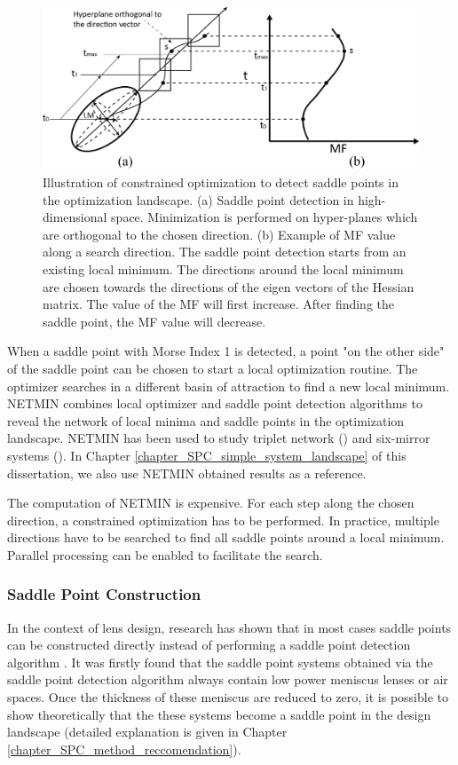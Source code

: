 \begin{figure}[h]
    \centering
    \includegraphics[scale=0.58]{chapter-1/figures/spd_plot.png}
    \caption{Illustration of constrained optimization to detect saddle points in the optimization landscape. (a) Saddle point detection in high-dimensional space. Minimization is performed on hyper-planes which are orthogonal to the chosen direction. (b) Example of MF value along a search direction. The saddle point detection starts from an existing local minimum. The directions around the local minimum are chosen towards the directions of the eigen vectors of the Hessian matrix. The value of the MF will first increase. After finding the saddle point, the MF value will decrease. }
    \label{fig: spd_illustration}
\end{figure} 

When a saddle point with Morse Index 1 is detected, a point "on the other side" of the saddle point can be chosen to start a local optimization routine. The optimizer searches in a different basin of attraction to find a new local minimum. NETMIN combines local optimizer and saddle point detection algorithms to reveal the network of local minima and saddle points in the optimization landscape. NETMIN has been used to study triplet network (\cite{PascalTriplet2009}) and six-mirror systems (\cite{MarinescuSPD07}). In Chapter \ref{chapter_SPC_simple_system_landscape} of this dissertation, we also use NETMIN obtained results as a reference. 

The computation of NETMIN is expensive. For each step along the chosen direction, a constrained optimization has to be performed. In practice, multiple directions have to be searched to find all saddle points around a local minimum. Parallel processing can be enabled to facilitate the search.  


\subsubsection{Saddle Point Construction }
In the context of lens design, research has shown that in most cases saddle points can be constructed directly instead of performing a saddle point detection algorithm \cite{vanTurnhoutThesis2009} \cite{MVTurnhoutSPC15}. It was firstly found that the saddle point systems obtained via the saddle point detection algorithm always contain low power meniscus lenses or air spaces. Once the thickness of these meniscus are reduced to zero, it is possible to show theoretically that the these systems become a saddle point in the design landscape (detailed explanation is given in Chapter \ref{chapter_SPC_method_reccomendation}).

